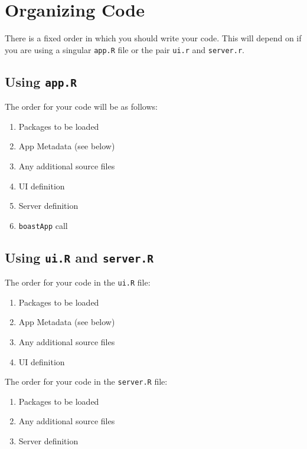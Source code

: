 \documentclass[
]{book}
\providecommand{\tightlist}{%
  \setlength{\itemsep}{0pt}\setlength{\parskip}{0pt}}
\begin{document}
\hypertarget{orgCode}{%
\section{Organizing Code}\label{orgCode}}

There is a fixed order in which you should write your code. This will depend on if you are using a singular \texttt{app.R} file or the pair \texttt{ui.r} and \texttt{server.r}.

\hypertarget{using-app.r}{%
\subsection{\texorpdfstring{Using \texttt{app.R}}{Using app.R}}\label{using-app.r}}

The order for your code will be as follows:

\begin{enumerate}
\def\labelenumi{\arabic{enumi}.}
\tightlist
\item
  Packages to be loaded
\item
  App Metadata (see below)
\item
  Any additional source files
\item
  UI definition
\item
  Server definition
\item
  \texttt{boastApp} call
\end{enumerate}

\hypertarget{using-ui.r-and-server.r}{%
\subsection{\texorpdfstring{Using \texttt{ui.R} and \texttt{server.R}}{Using ui.R and server.R}}\label{using-ui.r-and-server.r}}

The order for your code in the \texttt{ui.R} file:

\begin{enumerate}
\def\labelenumi{\arabic{enumi}.}
\tightlist
\item
  Packages to be loaded
\item
  App Metadata (see below)
\item
  Any additional source files
\item
  UI definition
\end{enumerate}

The order for your code in the \texttt{server.R} file:

\begin{enumerate}
\def\labelenumi{\arabic{enumi}.}
\tightlist
\item
  Packages to be loaded
\item
  Any additional source files
\item
  Server definition
\end{enumerate}
\end{document}
